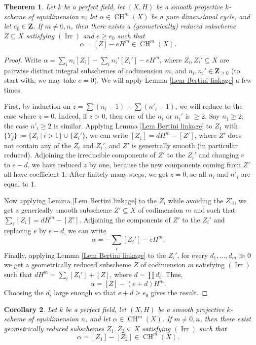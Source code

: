 \documentclass[11pt]{amsart}
\newtheorem{Thm}{Theorem}[section]              %
\newtheorem{Cor}[Thm]{Corollary}
\theoremstyle{definition}
\newcommand{\Z}{\mathbf Z}
\newcommand{\CH}{\operatorname{CH}}
\newcommand{\Irr}{\operatorname{Irr}}
\begin{document}
\begin{Thm}\label{Thm difference of irreducible cycles}
Let $k$ be a perfect field, let $(X,H)$ be a smooth projective
$k$-scheme of equidimension $n$, let $\alpha \in \CH^m(X)$ be a pure
dimensional cycle, and let $e_0 \in \Z$. If $m \neq 0,n$, then there
exists a (geometrically) reduced subscheme $Z \subseteq X$
satisfying $(\Irr)$ and $e \geq e_0$ such that
\[
\alpha = [Z] - eH^m \in \CH^m(X).
\]
\end{Thm}

\begin{proof}
Write $\alpha = \sum_i n_i[Z_i] - \sum_i n_i'[Z_i'] - eH^m$, where
$Z_i, Z_i' \subseteq X$ are pairwise distinct integral subschemes of
codimension $m$, and $n_i, n_i' \in \Z_{\geq 0}$ (to start with, we
may take $e = 0$). We will apply Lemma \ref{Lem Bertini linkage} a
few times.

First, by induction on $z = \sum (n_i - 1) + \sum (n'_i - 1)$, we
will reduce to the case where $z = 0$. Indeed, if $z > 0$, then one
of the $n_i$ or $n_i'$ is $\geq 2$. Say $n_1 \geq 2$; the case $n'_i
\geq 2$ is similar. Applying Lemma \ref{Lem Bertini linkage} to
$Z_1$ with $\{Y_j\} := \{Z_i\ |\ i > 1\} \cup \{Z_i'\}$, we can
write $[Z_1] = dH^m - [Z']$, where $Z'$ does not contain any of the
$Z_i$ and $Z_i'$, and $Z'$ is generically smooth (in particular
reduced).
%
Adjoining the irreducible components of $Z'$ to the $Z_i'$ and
changing $e$ to $e-d$, we have reduced $z$ by one, because the new
components coming from $Z'$ all have coefficient $1$. After finitely
many steps, we get $z = 0$, so all $n_i$ and $n'_i$ are equal to
$1$.

Now applying Lemma \ref{Lem Bertini linkage} to the $Z_i$ while
avoiding the $Z'_i$, we get a generically smooth subscheme $Z'
\subseteq X$ of codimension $m$ and such that $\sum_i [Z_i] = d H^m
- [Z']$. Adjoining the components of $Z'$ to the $Z_i'$ and
replacing $e$ by $e-d$, we can write
\[
\alpha = - \sum_i [Z_i'] - eH^m.
\]
Finally, applying Lemma \ref{Lem Bertini linkage} to the $Z_i'$, for
every $d_1,\ldots,d_m \gg 0$ we get a geometrically reduced
subscheme $Z$ of codimension $m$ satisfying $(\Irr)$ such that $d
H^m = \sum_i [Z_i'] + [Z]$, where $d = \prod d_i$. Thus,
\[
\alpha = [Z] - (e+d)H^m.
\]
Choosing the $d_i$ large enough so that $e+d \geq e_0$ gives the
result.
\end{proof}

\begin{Cor}\label{Cor difference of irreducible cycles}
Let $k$ be a perfect field, let $(X,H)$ be a smooth projective
$k$-scheme of equidimension $n$, and let $\alpha \in \CH^m(X)$. If
$m \neq 0, n$, then there exist geometrically reduced subschemes
$Z_1,Z_2 \subseteq X$ satisfying $(\Irr)$ such that
\[
\alpha = [Z_1] - [Z_2] \in \CH^m(X).
\]
\end{Cor}
\end{document}
